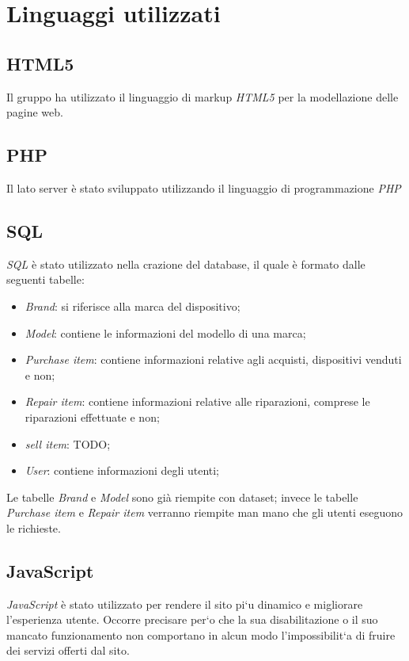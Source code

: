 \section{Linguaggi utilizzati}

\subsection{HTML5}
Il gruppo ha utilizzato il linguaggio di markup \textit{HTML5} per la
modellazione delle pagine web.

\subsection{PHP}
Il lato server è stato sviluppato utilizzando il linguaggio di programmazione \textit{PHP}

\subsection{SQL}
\textit{SQL} è stato utilizzato nella crazione del database, il quale è formato dalle seguenti tabelle:

\begin{itemize}
	\item \textit{Brand}: si riferisce alla marca del dispositivo;
	\item \textit{Model}: contiene le informazioni del modello di una marca;
	\item \textit{Purchase item}: contiene informazioni relative agli acquisti, dispositivi venduti e non;
	\item \textit{Repair item}: contiene informazioni relative alle riparazioni, comprese le riparazioni effettuate e non;
	\item \textit{sell item}: TODO;
	\item \textit{User}: contiene informazioni degli utenti;
\end{itemize}

Le tabelle \textit{Brand} e \textit{Model} sono già riempite con dataset; invece le tabelle \textit{Purchase item} e \textit{Repair item}
verranno riempite man mano che gli utenti eseguono le richieste.

\subsection{JavaScript}
\textit{JavaScript } è stato utilizzato per rendere il sito pi`u dinamico e migliorare l’esperienza utente. Occorre
precisare per`o che la sua disabilitazione o il suo mancato funzionamento non comportano in alcun
modo l’impossibilit`a di fruire dei servizi offerti dal sito.

